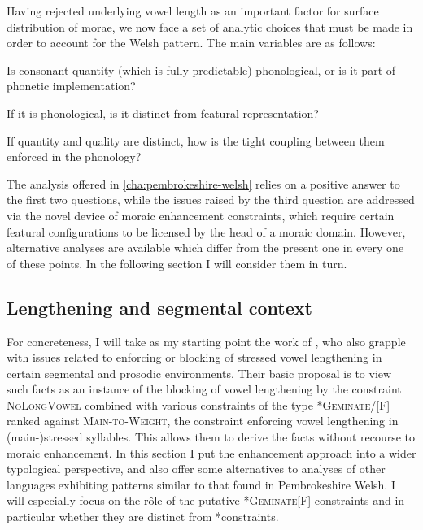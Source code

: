 Having rejected underlying vowel length as an important factor for surface distribution of morae, we now face a set of analytic choices that must be made in order to account for the Welsh pattern. The main variables are as follows:

\begin{itemize*}
\item Is consonant quantity (which is fully predictable) phonological, or is it part of phonetic implementation?
\item If it is phonological, is it distinct from featural representation?
\item If quantity and quality are distinct, how is the tight coupling between them enforced in the phonology?
\end{itemize*}

The analysis offered in \cref{cha:pembrokeshire-welsh} relies on a positive answer to the first two questions, while the issues raised by the third question are addressed via the novel device of moraic enhancement constraints, which require certain featural configurations to be licensed by the head of a moraic domain. However, alternative analyses are available which differ from the present one in every one of these points. In the following section I will consider them in turn.

\subsection{Lengthening and segmental context}
\label{sec:length-segm-cont}

For concreteness, I will take as my starting point the work of \citet{bye08}, who also grapple with issues related to enforcing or blocking of stressed vowel lengthening in certain segmental and prosodic environments. Their basic proposal is to view such facts as an instance of the blocking of vowel lengthening by the constraint \textsc{NoLongVowel} combined with various constraints of the type *\textsc{Geminate}/[F] ranked against \textsc{Main-to-Weight}, \ie the constraint enforcing vowel lengthening in (main-)stressed syllables. This allows them to derive the facts without recourse to moraic enhancement. In this section I put the enhancement approach into a wider typological perspective, and also offer some alternatives to  analyses of other languages exhibiting patterns similar to that found in Pembrokeshire Welsh. I will especially focus on the rôle of the putative *\textsc{Geminate}[F] constraints and in particular whether they are distinct from *\mo[F] constraints.

